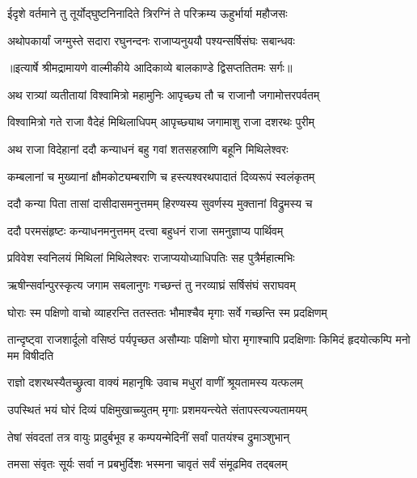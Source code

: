 \twolineshloka
{ईदृशे वर्तमाने तु तूर्योद्घुष्टनिनादिते}
{त्रिरग्निं ते परिक्रम्य ऊहुर्भार्या महौजसः} %

\twolineshloka
{अथोपकार्यां जग्मुस्ते सदारा रघुनन्दनः}
{राजाप्यनुययौ पश्यन्सर्षिसंघः सबान्धवः} %


{॥इत्यार्षे श्रीमद्रामायणे वाल्मीकीये आदिकाव्ये बालकाण्डे द्विसप्ततितमः सर्गः॥}


\twolineshloka
{अथ रात्र्यां व्यतीतायां विश्वामित्रो महामुनिः}
{आपृच्छ्य तौ च राजानौ जगामोत्तरपर्वतम्} %

\twolineshloka
{विश्वामित्रो गते राजा वैदेहं मिथिलाधिपम्}
{आपृच्छ्याथ जगामाशु राजा दशरथः पुरीम्} %

\twolineshloka
{अथ राजा विदेहानां ददौ कन्याधनं बहु}
{गवां शतसहस्राणि बहूनि मिथिलेश्वरः} %

\twolineshloka
{कम्बलानां च मुख्यानां क्षौमकोट्यम्बराणि च}
{हस्त्यश्वरथपादातं दिव्यरूपं स्वलंकृतम्} %

\twolineshloka
{ददौ कन्या पिता तासां दासीदासमनुत्तमम्}
{हिरण्यस्य सुवर्णस्य मुक्तानां विद्रुमस्य च} %

\twolineshloka
{ददौ परमसंहृष्टः कन्याधनमनुत्तमम्}
{दत्त्वा बहुधनं राजा समनुज्ञाप्य पार्थिवम्} %

\twolineshloka
{प्रविवेश स्वनिलयं मिथिलां मिथिलेश्वरः}
{राजाप्ययोध्याधिपतिः सह पुत्रैर्महात्मभिः} %

\twolineshloka
{ऋषीन्सर्वान्पुरस्कृत्य जगाम सबलानुगः}
{गच्छन्तं तु नरव्याघ्रं सर्षिसंघं सराघवम्} %

\twolineshloka
{घोराः स्म पक्षिणो वाचो व्याहरन्ति ततस्ततः}
{भौमाश्चैव मृगाः सर्वे गच्छन्ति स्म प्रदक्षिणम्} %

\threelineshloka
{तान्दृष्ट्वा राजशार्दूलो वसिष्ठं पर्यपृच्छत}
{असौम्याः पक्षिणो घोरा मृगाश्चापि प्रदक्षिणाः}
{किमिदं हृदयोत्कम्पि मनो मम विषीदति} %

\twolineshloka
{राज्ञो दशरथस्यैतच्छ्रुत्वा वाक्यं महानृषिः}
{उवाच मधुरां वाणीं श्रूयतामस्य यत्फलम्} %

\twolineshloka
{उपस्थितं भयं घोरं दिव्यं पक्षिमुखाच्च्युतम्}
{मृगाः प्रशमयन्त्येते संतापस्त्यज्यतामयम्} %

\twolineshloka
{तेषां संवदतां तत्र वायुः प्रादुर्बभूव ह}
{कम्पयन्मेदिनीं सर्वां पातयंश्च द्रुमाञ्शुभान्} %

\twolineshloka
{तमसा संवृतः सूर्यः सर्वा न प्रबभुर्दिशः}
{भस्मना चावृतं सर्वं संमूढमिव तद्बलम्} %

